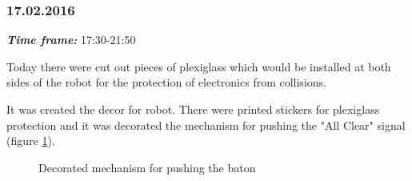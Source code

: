\subsubsection{17.02.2016}
\textit{\textbf{Time frame:}} 17:30-21:50 

Today there were cut out pieces of plexiglass which would be installed at both sides of the robot for the protection of electronics from collisions.

It was created the decor for robot. There were printed stickers for plexiglass protection and it was decorated the mechanism for pushing the "All Clear" signal (figure \ref{Decor1.1}).

\begin{figure}[H]
	\begin{minipage}[h]{1\linewidth}
		\caption{Decorated mechanism for pushing the baton}
		\label{Decor1.1}
	\end{minipage}
\end{figure}
